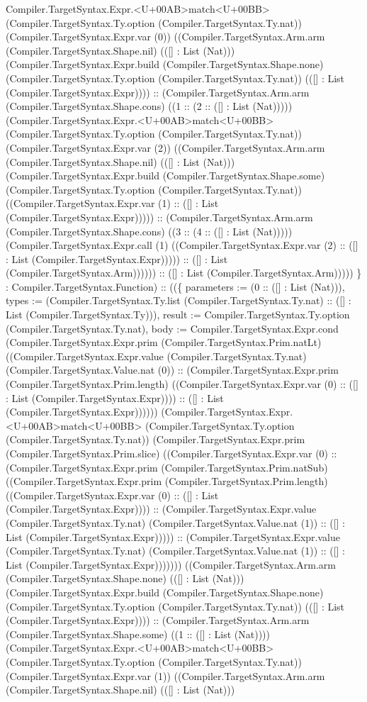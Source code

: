 \documentclass[11pt]{article}
\begin{document}
Compiler.TargetSyntax.Expr.<U+00AB>match<U+00BB> (Compiler.TargetSyntax.Ty.option (Compiler.TargetSyntax.Ty.nat)) (Compiler.TargetSyntax.Expr.var (0)) ((Compiler.TargetSyntax.Arm.arm (Compiler.TargetSyntax.Shape.nil) (([] : List (Nat))) (Compiler.TargetSyntax.Expr.build (Compiler.TargetSyntax.Shape.none) (Compiler.TargetSyntax.Ty.option (Compiler.TargetSyntax.Ty.nat)) (([] : List (Compiler.TargetSyntax.Expr)))) :: (Compiler.TargetSyntax.Arm.arm (Compiler.TargetSyntax.Shape.cons) ((1 :: (2 :: ([] : List (Nat))))) (Compiler.TargetSyntax.Expr.<U+00AB>match<U+00BB> (Compiler.TargetSyntax.Ty.option (Compiler.TargetSyntax.Ty.nat)) (Compiler.TargetSyntax.Expr.var (2)) ((Compiler.TargetSyntax.Arm.arm (Compiler.TargetSyntax.Shape.nil) (([] : List (Nat))) (Compiler.TargetSyntax.Expr.build (Compiler.TargetSyntax.Shape.some) (Compiler.TargetSyntax.Ty.option (Compiler.TargetSyntax.Ty.nat)) ((Compiler.TargetSyntax.Expr.var (1) :: ([] : List (Compiler.TargetSyntax.Expr))))) :: (Compiler.TargetSyntax.Arm.arm (Compiler.TargetSyntax.Shape.cons) ((3 :: (4 :: ([] : List (Nat))))) (Compiler.TargetSyntax.Expr.call (1) ((Compiler.TargetSyntax.Expr.var (2) :: ([] : List (Compiler.TargetSyntax.Expr))))) :: ([] : List (Compiler.TargetSyntax.Arm)))))) :: ([] : List (Compiler.TargetSyntax.Arm))))) \} : Compiler.TargetSyntax.Function) :: ((\{ parameters := (0 :: ([] : List (Nat))), types := (Compiler.TargetSyntax.Ty.list (Compiler.TargetSyntax.Ty.nat) :: ([] : List (Compiler.TargetSyntax.Ty))), result := Compiler.TargetSyntax.Ty.option (Compiler.TargetSyntax.Ty.nat), body := Compiler.TargetSyntax.Expr.cond (Compiler.TargetSyntax.Expr.prim (Compiler.TargetSyntax.Prim.natLt) ((Compiler.TargetSyntax.Expr.value (Compiler.TargetSyntax.Ty.nat) (Compiler.TargetSyntax.Value.nat (0)) :: (Compiler.TargetSyntax.Expr.prim (Compiler.TargetSyntax.Prim.length) ((Compiler.TargetSyntax.Expr.var (0) :: ([] : List (Compiler.TargetSyntax.Expr)))) :: ([] : List (Compiler.TargetSyntax.Expr)))))) (Compiler.TargetSyntax.Expr.<U+00AB>match<U+00BB> (Compiler.TargetSyntax.Ty.option (Compiler.TargetSyntax.Ty.nat)) (Compiler.TargetSyntax.Expr.prim (Compiler.TargetSyntax.Prim.slice) ((Compiler.TargetSyntax.Expr.var (0) :: (Compiler.TargetSyntax.Expr.prim (Compiler.TargetSyntax.Prim.natSub) ((Compiler.TargetSyntax.Expr.prim (Compiler.TargetSyntax.Prim.length) ((Compiler.TargetSyntax.Expr.var (0) :: ([] : List (Compiler.TargetSyntax.Expr)))) :: (Compiler.TargetSyntax.Expr.value (Compiler.TargetSyntax.Ty.nat) (Compiler.TargetSyntax.Value.nat (1)) :: ([] : List (Compiler.TargetSyntax.Expr))))) :: (Compiler.TargetSyntax.Expr.value (Compiler.TargetSyntax.Ty.nat) (Compiler.TargetSyntax.Value.nat (1)) :: ([] : List (Compiler.TargetSyntax.Expr))))))) ((Compiler.TargetSyntax.Arm.arm (Compiler.TargetSyntax.Shape.none) (([] : List (Nat))) (Compiler.TargetSyntax.Expr.build (Compiler.TargetSyntax.Shape.none) (Compiler.TargetSyntax.Ty.option (Compiler.TargetSyntax.Ty.nat)) (([] : List (Compiler.TargetSyntax.Expr)))) :: (Compiler.TargetSyntax.Arm.arm (Compiler.TargetSyntax.Shape.some) ((1 :: ([] : List (Nat)))) (Compiler.TargetSyntax.Expr.<U+00AB>match<U+00BB> (Compiler.TargetSyntax.Ty.option (Compiler.TargetSyntax.Ty.nat)) (Compiler.TargetSyntax.Expr.var (1)) ((Compiler.TargetSyntax.Arm.arm (Compiler.TargetSyntax.Shape.nil) (([] : List (Nat))) 
\end{document}
